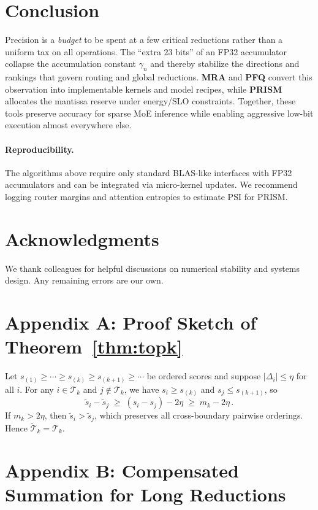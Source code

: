 \documentclass[11pt]{article}
\theoremstyle{plain}
\theoremstyle{definition}
\begin{document}
\section{Conclusion}

Precision is a \emph{budget} to be spent at a few critical reductions rather than a uniform tax on all operations. The ``extra $23$ bits'' of an FP32 accumulator collapse the accumulation constant $\gamma_n$ and thereby stabilize the directions and rankings that govern routing and global reductions. \textbf{MRA} and \textbf{PFQ} convert this observation into implementable kernels and model recipes, while \textbf{PRISM} allocates the mantissa reserve under energy/SLO constraints. Together, these tools preserve accuracy for sparse MoE inference while enabling aggressive low-bit execution almost everywhere else.

\paragraph{Reproducibility.} The algorithms above require only standard BLAS-like interfaces with FP32 accumulators and can be integrated via micro-kernel updates. We recommend logging router margins and attention entropies to estimate $\mathrm{PSI}$ for PRISM.

\section*{Acknowledgments}
We thank colleagues for helpful discussions on numerical stability and systems design. Any remaining errors are our own.

\appendix

\section{Appendix A: Proof Sketch of Theorem~\ref{thm:topk}}

Let $s_{(1)}\ge \cdots \ge s_{(k)} \ge s_{(k+1)} \ge \cdots$ be ordered scores and suppose $|\Delta_i|\le \eta$ for all $i$. For any $i\in \mathcal{T}_k$ and $j\notin \mathcal{T}_k$, we have $s_i \ge s_{(k)}$ and $s_j \le s_{(k+1)}$, so
\[
\tilde s_i - \tilde s_j \;\ge\; (s_i - s_j) - 2\eta \;\ge\; m_k - 2\eta\,.
\]
If $m_k > 2\eta$, then $\tilde s_i > \tilde s_j$, which preserves all cross-boundary pairwise orderings. Hence $\tilde{\mathcal{T}}_k=\mathcal{T}_k$.

\section{Appendix B: Compensated Summation for Long Reductions}
\end{document}
